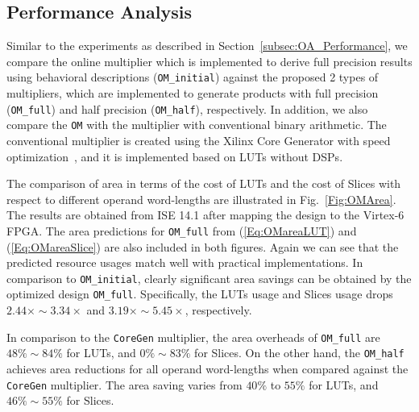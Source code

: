 \documentclass[conference]{IEEEtran}
\begin{document}
\subsection{Performance Analysis}
Similar to the experiments as described in Section~\ref{subsec:OA_Performance}, we compare the online multiplier which is implemented to derive full precision results using behavioral descriptions (\texttt{OM\_initial}) against the proposed 2 types of multipliers, which are implemented to generate products with full precision (\texttt{OM\_full}) and half precision (\texttt{OM\_half}), respectively. In addition, we also compare the \texttt{OM} with the multiplier with conventional binary arithmetic. The conventional multiplier is created using the Xilinx Core Generator with speed optimization~\cite{XilinxMult}, and it is implemented based on LUTs without DSPs.

The comparison of area in terms of the cost of LUTs and the cost of Slices with respect to different operand word-lengths are illustrated in Fig.~\ref{Fig:OMArea}. The results are obtained from ISE 14.1 after mapping the design to the Virtex-6 FPGA. The area predictions for \texttt{OM\_full} from (\ref{Eq:OMareaLUT}) and (\ref{Eq:OMareaSlice}) are also included in both figures. Again we can see that the predicted resource usages match well with practical implementations. In comparison to \texttt{OM\_initial}, clearly significant area savings can be obtained by the optimized design \texttt{OM\_full}. Specifically, the LUTs usage and Slices usage drops $2.44\times\sim3.34\times$ and $3.19\times\sim5.45\times$, respectively.

In comparison to the \texttt{CoreGen} multiplier, the area overheads of \texttt{OM\_full} are $48\%\sim84\%$ for LUTs, and $0\%\sim83\%$ for Slices. On the other hand, the \texttt{OM\_half} achieves area reductions for all operand word-lengths when compared against the \texttt{CoreGen} multiplier. The area saving varies from $40\%$ to $55\%$ for LUTs, and $46\%\sim55\%$ for Slices.
\end{document}
